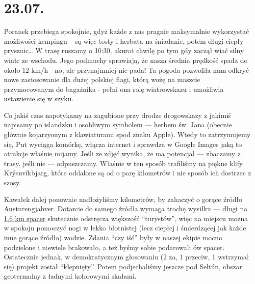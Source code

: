 \chapter*{23.07.}

Poranek przebiega spokojnie, gdyż każde z nas pragnie maksymalnie wykorzystać możliwości kempingu -- są więc tosty i herbata na śniadanie, potem długi ciepły prysznic… W trasę ruszamy o 10:30, akurat chwilę po tym gdy zaczął wiać silny wiatr ze wschodu. Jego podmuchy sprawiają, że nasza średnia prędkość spada do około 12 km/h - no, ale przynajmniej nie pada! Ta pogoda pozwoliła nam odkryć nowe zastosowanie dla dużej polskiej flagi, którą wożę na maszcie przymocowanym do bagażnika - pełni ona rolę wiatrowskazu i umożliwia ustawienie się w szyku.


Co jakiś czas napotykamy na zagubione przy drodze drogowskazy z jakimiś napisamy po islandzku i osobliwym symbolem --- herbem św. Jana (obecnie głównie kojarzyonym z klawiaturami spod znaku Apple). Wtedy to zatrzymujemy się, Put wyciąga komórkę, włącza internet i sprawdza w Google Images jaką to atrakcje właśnie mijamy. Jeśli ze zdjęć wynika, że ma potencjał --- zbaczamy z trasy, jeśli nie --- odpuszczamy. Właśnie w ten sposób trafiliśmy na piękne klify Krýsuvíkbjarg, które oddalone są od  o parę kilometrów i nie sposób ich dostrzec z szosy.


Kawałek dalej ponownie nadłożyliśmy kilometrów, by zahaczyć o gorące źródło Austurengjahver. Dotarcie do samego źródła wymaga trochę wysiłku --- \href{http://www.openstreetmap.org/way/33182596}{długi na 1,6 km spacer} skutecznie odstręcza większość “turystów”, więc na miejscu można w spokoju pomoczyć nogi w lekko błotnistej (lecz ciepłej i śmierdzącej jak każde inne gorące źródło) wodzie. Zdania “czy iść” były w naszej ekipie mocno podzielone i niewiele brakowało, a też byśmy sobie podarowali ów spacer. Ostatecznie jednak, w demokratycznym głosowaniu (2 za, 1 przeciw, 1 wstrzymał się) projekt został “klepnięty”. Potem podjechaliśmy jeszcze pod Seltún, obszar geotermalny z ładnymi kolorowymi skałami.

